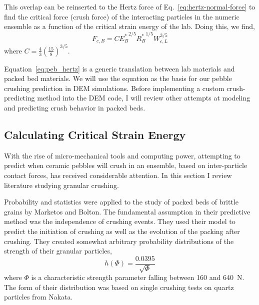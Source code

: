 This overlap can be reinserted to the Hertz force of Eq.~\ref{eq:hertz-normal-force} to find the critical force (crush force) of the interacting particles in the numeric ensemble as a function of the critical strain energy of the lab. Doing this, we find,
\begin{equation}\label{eq:peb_hertz}
	F_{c,B} = C{E_B^*}^{2/5}{R_B^*}^{1/5}W_{\epsilon,L}^{3/5}
\end{equation}
where $C = \frac{4}{3}\left(\frac{15}{8}\right)^{3/5}$.

Equation~\ref{eq:peb_hertz} is a generic translation between lab materials and packed bed materials. We will use the equation as the basis for our pebble crushing prediction in DEM simulations. Before implementing a custom crush-predicting method into the DEM code, I will review other attempts at modeling and predicting crush behavior in packed beds.





\subsection{Calculating Critical Strain Energy}
With the rise of micro-mechanical tools and computing power, attempting to predict when ceramic pebbles will crush in an ensemble, based on inter-particle contact forces, has received considerable attention. In this section I review literature studying granular crushing.

Probability and statistics were applied to the study of packed beds of brittle grains by Marketos and Bolton\cite{Marketos2007}. The fundamental assumption in their predictive method was the independence of crushing events. They used their model to predict the initiation of crushing as well as the evolution of the packing after crushing. They created somewhat arbitrary probability distributions of the strength of their granular particles,
\begin{equation}
	h(\Phi) = \frac{0.0395}{\sqrt{\Phi}}
\end{equation}
where $\Phi$ is a characteristic strength parameter falling between 160 and 640~N. The form of their distribution was based on single crushing tests on quartz particles from Nakata\etal.

